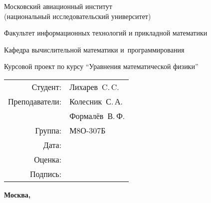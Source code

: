 \documentclass[12pt]{article}
\begin{document}
\begin{center}
\bfseries

{\Large Московский авиационный институт\\ (национальный исследовательский университет)

}

\vspace{48pt}

{\large Факультет информационных технологий и прикладной математики
}

\vspace{36pt}


{\large Кафедра вычислительной математики и~программирования

}


\vspace{48pt}

Курсовой проект по курсу \enquote{Уравнения математической физики}

\end{center}

\vspace{72pt}

\begin{flushright}
\begin{tabular}{rl}
Студент: & Лихарев\ C.\,C. \\
Преподаватели: & Колесник\ С.\,А. \\ & Формалёв\ В.\,Ф. \\
Группа: & М8О-307Б \\
Дата: & \\
Оценка: & \\
Подпись: & \\
\end{tabular}
\end{flushright}

\vfill
\pagestyle{empty}
\begin{center}
\bfseries
Москва, \the\year
\end{center}

\newpage
\renewcommand{\cftdot}{}
\tableofcontents
\pagestyle{plain}
\setcounter{page}{1}
\newpage




\end{document}
